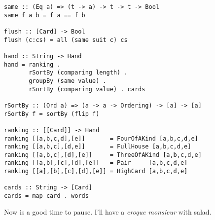 \lhN
\hspace*{\fill}
\lhA
\begin{lstlisting}[frame=single]
same :: (Eq a) => (t -> a) -> t -> t -> Bool
same f a b = f a == f b

flush :: [Card] -> Bool
flush (c:cs) = all (same suit c) cs

hand :: String -> Hand
hand = ranking . 
       rSortBy (comparing length) .
       groupBy (same value) . 
       rSortBy (comparing value) . cards

rSortBy :: (Ord a) => (a -> a -> Ordering) -> [a] -> [a]
rSortBy f = sortBy (flip f)

ranking :: [[Card]] -> Hand
ranking [[a,b,c,d],[e]]       = FourOfAKind [a,b,c,d,e]
ranking [[a,b,c],[d,e]]       = FullHouse [a,b,c,d,e]
ranking [[a,b,c],[d],[e]]     = ThreeOfAKind [a,b,c,d,e]
ranking [[a,b],[c],[d],[e]]   = Pair     [a,b,c,d,e]
ranking [[a],[b],[c],[d],[e]] = HighCard [a,b,c,d,e] 

cards :: String -> [Card]
cards = map card . words 
\end{lstlisting}
\lhN Now is a good time to pause.
\lhA I'll have a \emph{croque monsieur} with salad.
\lhend


